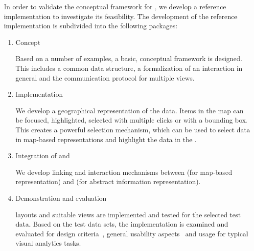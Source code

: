 In order to validate the conceptual framework for \cmvs{}, we develop a reference implementation to investigate its feasibility.
The development of the reference implementation is subdivided into the following packages:

\begin{enumerate}
  \item
    Concept

    Based on a number of examples, a basic, conceptual framework is designed.
    This includes a common data structure, a formalization of an interaction in general and the communication protocol for multiple views.

  \item
    Implementation

    We develop a geographical representation of the data.
    Items in the map can be focused, highlighted, selected with multiple clicks or with a bounding box.
    This creates a powerful selection mechanism, which can be used to select data in map-based representations and highlight the data in the \tmap{}.

  \item
    Integration of \tmap{} and \map{}

    We develop linking and interaction mechanisms between \maps{} (for map-based representation) and \tmaps{} (for abstract information representation).

  \item
    Demonstration and evaluation

    \cmv{} layouts and suitable views are implemented and tested for the selected test data.
    Based on the test data sets, the \cmv{} implementation is examined and evaluated for design criteria~\cite{Baldonado2000}, general usability aspects~\cite{Roberts2007} and usage for typical visual analytics tasks.
\end{enumerate}

